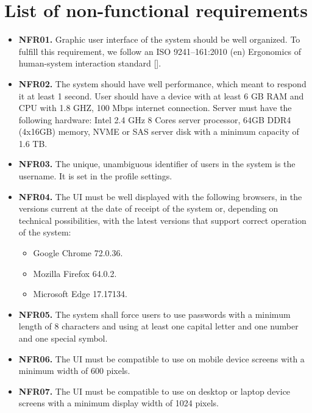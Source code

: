 \chapter{List of non-functional requirements}\label{ch:list-of-non-functional-requirements}
\begin{itemize}
    \item \textbf{NFR01.} Graphic user interface of the system should be well organized.
    To fulfill this requirement, we follow an ISO 9241--161:2010 (en) Ergonomics of human-system interaction
    standard [\cite{iso2010ergonomics}].
    \item \textbf{NFR02.} The system should have well performance, which meant to respond it at least 1 second.
    User should have a device with at least 6 GB RAM and CPU with 1.8 GHZ, 100 Mbps internet connection.
    Server must have the following hardware: Intel 2.4 GHz 8 Cores server processor, 64GB DDR4 (4x16GB) memory, NVME or SAS
    server disk with a minimum capacity of 1.6 TB\@.
    \item \textbf{NFR03.} The unique, unambiguous identifier of users in the system is the username.
    It is set in the profile settings.
    \item \textbf{NFR04.} The UI must be well displayed with the following browsers, in the versions
    current at the date of receipt of the system or, depending on technical possibilities,
    with the latest versions that support correct operation of the system:
    \begin{itemize}
        \item Google Chrome 72.0.36.
        \item Mozilla Firefox 64.0.2.
        \item Microsoft Edge 17.17134.
    \end{itemize}
    \item \textbf{NFR05.} The system shall force users to use passwords with a minimum length of 8
    characters and using at least one capital letter and one number and one special symbol.
    \item \textbf{NFR06.} The UI must be compatible to use on mobile device screens with a minimum
    width of 600 pixels.
    \item \textbf{NFR07.} The UI must be compatible to use on desktop or laptop device screens with a
    minimum display width of 1024 pixels.
\end{itemize}